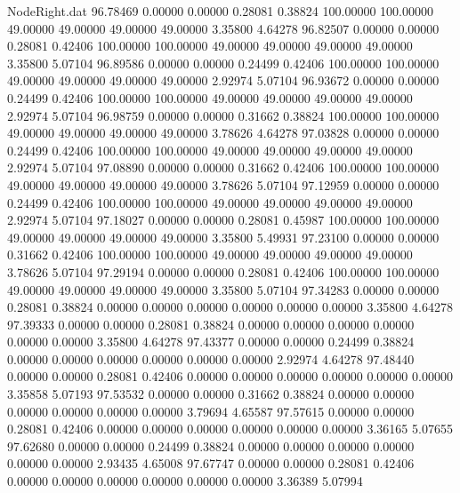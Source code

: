 \begin{filecontents}{NodeRight.dat}
  96.78469    0.00000    0.00000     0.28081    0.38824  100.00000  100.00000   49.00000   49.00000   49.00000   49.00000    3.35800    4.64278
  96.82507    0.00000    0.00000     0.28081    0.42406  100.00000  100.00000   49.00000   49.00000   49.00000   49.00000    3.35800    5.07104
  96.89586    0.00000    0.00000     0.24499    0.42406  100.00000  100.00000   49.00000   49.00000   49.00000   49.00000    2.92974    5.07104
  96.93672    0.00000    0.00000     0.24499    0.42406  100.00000  100.00000   49.00000   49.00000   49.00000   49.00000    2.92974    5.07104
  96.98759    0.00000    0.00000     0.31662    0.38824  100.00000  100.00000   49.00000   49.00000   49.00000   49.00000    3.78626    4.64278
  97.03828    0.00000    0.00000     0.24499    0.42406  100.00000  100.00000   49.00000   49.00000   49.00000   49.00000    2.92974    5.07104
  97.08890    0.00000    0.00000     0.31662    0.42406  100.00000  100.00000   49.00000   49.00000   49.00000   49.00000    3.78626    5.07104
  97.12959    0.00000    0.00000     0.24499    0.42406  100.00000  100.00000   49.00000   49.00000   49.00000   49.00000    2.92974    5.07104
  97.18027    0.00000    0.00000     0.28081    0.45987  100.00000  100.00000   49.00000   49.00000   49.00000   49.00000    3.35800    5.49931
  97.23100    0.00000    0.00000     0.31662    0.42406  100.00000  100.00000   49.00000   49.00000   49.00000   49.00000    3.78626    5.07104
  97.29194    0.00000    0.00000     0.28081    0.42406  100.00000  100.00000   49.00000   49.00000   49.00000   49.00000    3.35800    5.07104
  97.34283    0.00000    0.00000     0.28081    0.38824    0.00000    0.00000    0.00000    0.00000    0.00000    0.00000    3.35800    4.64278
  97.39333    0.00000    0.00000     0.28081    0.38824    0.00000    0.00000    0.00000    0.00000    0.00000    0.00000    3.35800    4.64278
  97.43377    0.00000    0.00000     0.24499    0.38824    0.00000    0.00000    0.00000    0.00000    0.00000    0.00000    2.92974    4.64278
  97.48440    0.00000    0.00000     0.28081    0.42406    0.00000    0.00000    0.00000    0.00000    0.00000    0.00000    3.35858    5.07193
  97.53532    0.00000    0.00000     0.31662    0.38824    0.00000    0.00000    0.00000    0.00000    0.00000    0.00000    3.79694    4.65587
  97.57615    0.00000    0.00000     0.28081    0.42406    0.00000    0.00000    0.00000    0.00000    0.00000    0.00000    3.36165    5.07655
  97.62680    0.00000    0.00000     0.24499    0.38824    0.00000    0.00000    0.00000    0.00000    0.00000    0.00000    2.93435    4.65008
  97.67747    0.00000    0.00000     0.28081    0.42406    0.00000    0.00000    0.00000    0.00000    0.00000    0.00000    3.36389    5.07994

\end{filecontents}
